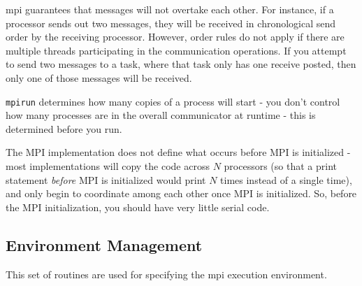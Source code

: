 \documentclass[10pt]{article}
\begin{document}
\begin{flushleft}
\gls{mpi} guarantees that messages will not overtake each other. For instance, if a processor sends out two messages, they will be received in chronological send order by the receiving processor. However, order rules do not apply if there are multiple threads participating in the communication operations. If you attempt to send two messages to a task, where that task only has one receive posted, then only one of those messages will be received. 

{\tt mpirun} determines how many copies of a process will start - you don't control how many processes are in the overall communicator at runtime - this is determined before you run. 

The MPI implementation does not define what occurs before MPI is initialized - most implementations will copy the code across \(N\) processors (so that a print statement {\it before} MPI is initialized would print \(N\) times instead of a single time), and only begin to coordinate among each other once MPI is initialized. So, before the MPI initialization, you should have very little serial code. 

\subsection{Environment Management}

This set of routines are used for specifying the \gls{mpi} execution environment. 


\end{flushleft}
\end{document}
